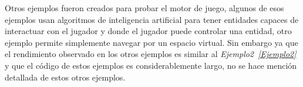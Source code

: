 Otros ejemplos fueron creados para probar el motor de juego, algunos de esos ejemplos usan algoritmos de inteligencia artificial para tener entidades capaces de interactuar con el jugador y donde el jugador puede controlar una entidad, otro ejemplo permite simplemente navegar por un espacio virtual. Sin embargo ya que el rendimiento observado en los otros ejemplos es similar al \emph{Ejemplo2~\ref{Ejemplo2}} y que el código de estos ejemplos es considerablemente largo, no se hace mención detallada de estos otros ejemplos.





